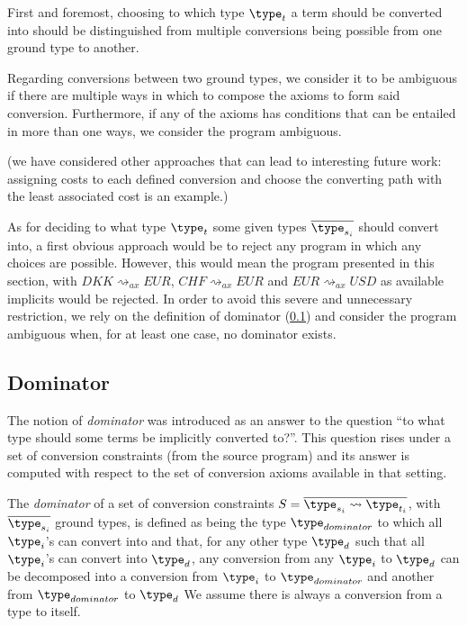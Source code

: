 First and foremost, choosing to which type $\type_t$ a term should be converted into should be distinguished from multiple conversions being possible from one ground type to another.

Regarding conversions between two ground types, we consider it to be ambiguous if there are multiple ways in which to compose the axioms to form said conversion. Furthermore, if any of the axioms has conditions that can be entailed in more than one ways, we consider the program ambiguous.

(we have considered other approaches that can lead to interesting future work: assigning costs to each defined conversion and choose the converting path with the least associated cost is an example.)

As for deciding to what type $\type_t$ some given types $\overline{\type_{s_i}}$ should convert into, a first obvious approach would be to reject any program in which any choices are possible. However, this would mean the program presented in this section, with $DKK\rightsquigarrow_{ax}EUR$, $CHF\rightsquigarrow_{ax}EUR$ and $EUR \rightsquigarrow_{ax} USD$ as available implicits would be rejected. In order to avoid this severe and unnecessary restriction, we rely on the definition of dominator (\ref{dom4}) and consider the program ambiguous when, for at least one case, no dominator exists.


\subsection{Dominator}
\label{dom4}
The notion of \textit{dominator} was introduced as an answer to the question ``to what type should some terms be implicitly converted to?''. This question rises under a set of conversion constraints (from the source program) and its answer is computed with respect to the set of conversion axioms available in that setting.

The \textit{dominator} of a set of conversion constraints $S=\overline{\type_{s_i}\rightsquigarrow \type_{t_i}}$, with $\overline{\type_{s_i}}$ ground types, is defined as being the type $\type_{dominator}$ to which all $\type_i$'s can convert into and that, for any other type $\type_d$ such that  all $\type_i$'s can convert into $\type_d$, any conversion from any $\type_i$ to $\type_d$ can be decomposed into a conversion from $\type_i$ to $\type_{dominator}$ and another from $\type_{dominator}$ to $\type_d$ We assume there is always a conversion from a type to itself.

